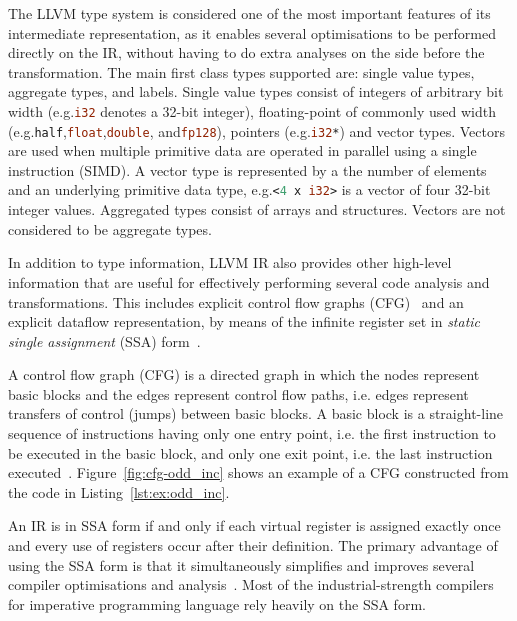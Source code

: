 The LLVM type system is considered one of the most important features of its intermediate representation, as it enables several optimisations to be performed directly on the IR, without having to do extra analyses on the side before the transformation.
The main first class types supported are: single value types, aggregate types, and labels.
Single value types consist of integers of arbitrary bit width (e.g.\lstinline[language=llvm,style=nasm]{i32} denotes a 32-bit integer), floating-point of commonly used width (e.g.\lstinline[language=llvm,style=nasm]{half},\lstinline[language=llvm,style=nasm]{float},\lstinline[language=llvm,style=nasm]{double}, and\lstinline[language=llvm,style=nasm]{fp128}), pointers (e.g.\lstinline[language=llvm,style=nasm]{i32*}) and vector types.
Vectors are used when multiple primitive data are operated in parallel using a single instruction (SIMD).
A vector type is represented by a the number of elements and an underlying primitive data type, e.g.\lstinline[language=llvm,style=nasm]{<4 x i32>} is a vector of four 32-bit integer values.
Aggregated types consist of arrays and structures.
Vectors are not considered to be aggregate types.

In addition to type information, LLVM IR also provides other high-level information that are useful for effectively performing several code analysis and transformations.
This includes explicit control flow graphs (CFG)~\citep{allen70} and an explicit dataflow representation, by means of the infinite register set in \textit{static single assignment} (SSA) form~\citep{alpern88,cytron89,cytron91}.

A control flow graph (CFG) is a directed graph in which the nodes represent basic blocks and the edges represent control flow paths, i.e. edges represent transfers of control (jumps) between basic blocks.
A basic block is a straight-line sequence of instructions having only one entry point, i.e. the first instruction to be executed in the basic block, and only one exit point, i.e. the last instruction executed~\citep{allen70,cytron91}.
Figure~\ref{fig:cfg-odd_inc} shows an example of a CFG constructed from the code in Listing~\ref{lst:ex:odd_inc}.

An IR is in SSA form if and only if each virtual register is assigned exactly once and every use of registers occur after their definition.
The primary advantage of using the SSA form is that it simultaneously simplifies and improves several compiler optimisations and analysis~\citep{alpern88,cytron91}.
Most of the industrial-strength compilers for imperative programming language rely heavily on the SSA form.

